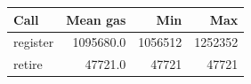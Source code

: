 \begin{tabular}{lrrr}
\hline
Call & Mean gas & Min & Max \\
\hline
register & 1095680.0 & 1056512 & 1252352 \\
retire & 47721.0 & 47721 & 47721 \\
\hline
\end{tabular}
